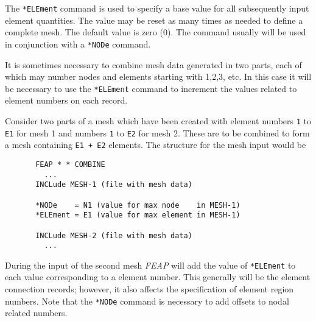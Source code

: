 \headb

The \texttt{*ELEment} command is used to specify a base value for all
subsequently input element quantities.  The value may be reset as many
times as needed to define a complete mesh.  The default value is zero (0).
The command usually will be used in conjunction with a \texttt{*NODe}
command.

It is sometimes necessary to combine mesh data generated in two parts,
each of which may number nodes and elements starting with 1,2,3, etc.
In this case it will be necessary to use the \texttt{*ELEment} command
to increment the values related to element numbers on each record.

Consider two parts of a mesh which have been created with element
numbers \texttt{1} to \texttt{E1} for mesh 1 and 
numbers \texttt{1} to \texttt{E2} for mesh 2.  These are to be combined
to form a mesh containing \texttt{E1 + E2} elements.  The structure for
the mesh input would be
\begin{verbatim}
       FEAP * * COMBINE
         ...
       INCLude MESH-1 (file with mesh data)

       *NODe    = N1 (value for max node    in MESH-1) 
       *ELEment = E1 (value for max element in MESH-1) 

       INCLude MESH-2 (file with mesh data)
         ...
\end{verbatim}

During the input of the second mesh \textsl{FEAP} will add the
value of \texttt{*ELEment} to each value corresponding to a element number.
This generally will be the element connection records; however, it also
affects the specification of element region numbers.
Note that the \texttt{*NODe} command is necessary to
add offsets to nodal related numbers.
\vfill\eject
